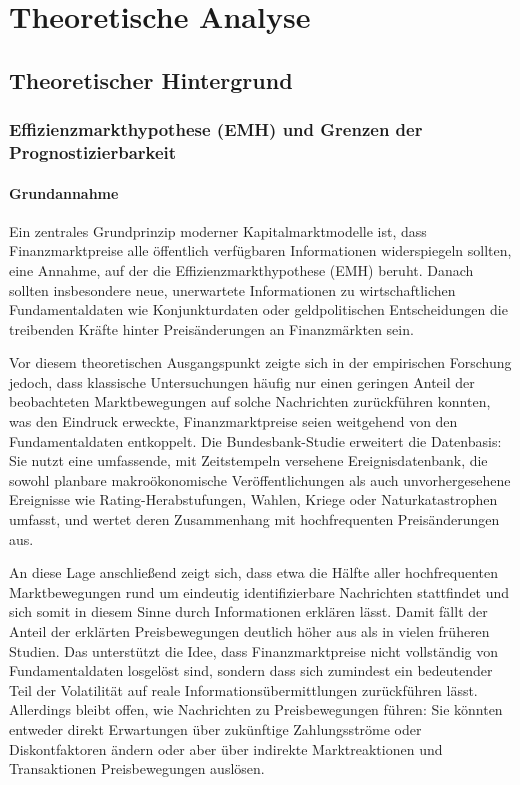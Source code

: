 \section{Theoretische Analyse} \label{maxi}
\subsection{Theoretischer Hintergrund}

\subsubsection{Effizienzmarkthypothese (EMH) und Grenzen der Prognostizierbarkeit}
\paragraph{Grundannahme}
Ein zentrales Grundprinzip moderner Kapitalmarktmodelle ist, dass Finanzmarktpreise alle öffentlich verfügbaren Informationen widerspiegeln sollten, eine Annahme, auf der die Effizienzmarkthypothese (EMH) beruht. Danach sollten insbesondere neue, unerwartete Informationen zu wirtschaftlichen Fundamentaldaten wie Konjunkturdaten oder geldpolitischen Entscheidungen die treibenden Kräfte hinter Preisänderungen an Finanzmärkten sein. \cite{Deutsche_Bundesbank}

Vor diesem theoretischen Ausgangspunkt zeigte sich in der empirischen Forschung jedoch, dass klassische Untersuchungen häufig nur einen geringen Anteil der beobachteten Marktbewegungen auf solche Nachrichten zurückführen konnten, was den Eindruck erweckte, Finanzmarktpreise seien weitgehend von den Fundamentaldaten entkoppelt. Die Bundesbank-Studie erweitert die Datenbasis: Sie nutzt eine umfassende, mit Zeitstempeln versehene Ereignisdatenbank, die sowohl planbare makroökonomische Veröffentlichungen als auch unvorhergesehene Ereignisse wie Rating-Herabstufungen, Wahlen, Kriege oder Naturkatastrophen umfasst, und wertet deren Zusammenhang mit hochfrequenten Preisänderungen aus.

An diese Lage anschließend zeigt sich, dass etwa die Hälfte aller hochfrequenten Marktbewegungen rund um eindeutig identifizierbare Nachrichten stattfindet und sich somit in diesem Sinne durch Informationen erklären lässt. Damit fällt der Anteil der erklärten Preisbewegungen deutlich höher aus als in vielen früheren Studien. Das unterstützt die Idee, dass Finanzmarktpreise nicht vollständig von Fundamentaldaten losgelöst sind, sondern dass sich zumindest ein bedeutender Teil der Volatilität auf reale Informationsübermittlungen zurückführen lässt. Allerdings bleibt offen, wie Nachrichten zu Preisbewegungen führen: Sie könnten entweder direkt Erwartungen über zukünftige Zahlungsströme oder Diskontfaktoren ändern oder aber über indirekte Marktreaktionen und Transaktionen Preisbewegungen auslösen. \cite{Gabler}


